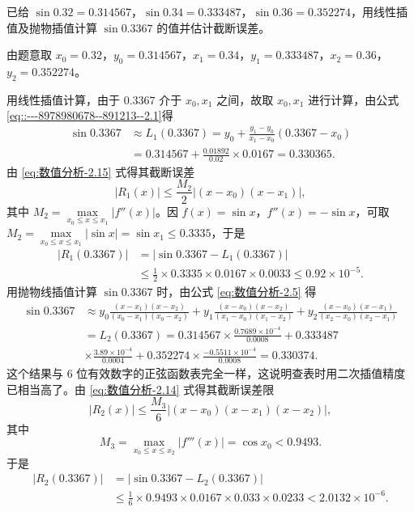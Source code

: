 \documentclass[../../main.tex]{subfiles}
\begin{document}
\begin{example}
已给 $\sin 0.32 = 0.314567$，$\sin 0.34 = 0.333487$，$\sin 0.36 = 0.352274$，用线性插值及抛物插值计算 $\sin 0.3367$ 的值并估计截断误差。
\end{example}
\begin{solution}
由题意取 $x_0 = 0.32$，$y_0 = 0.314567$，$x_1 = 0.34$，$y_1 = 0.333487$，$x_2 = 0.36$，$y_2 = 0.352274$。

用线性插值计算，由于 $0.3367$ 介于 $x_0, x_1$ 之间，故取 $x_0, x_1$ 进行计算，由公式\eqref{eq::---8978980678--891213--2.1}得 
\begin{align*}
\sin 0.3367 &\approx L_1(0.3367) = y_0 + \frac{y_1 - y_0}{x_1 - x_0}(0.3367 - x_0) \\
&= 0.314567 + \frac{0.01892}{0.02} \times 0.0167 = 0.330365.
\end{align*}
由 \eqref{eq:数值分析-2.15} 式得其截断误差 
\[
|R_1(x)| \leqslant \frac{M_2}{2} |(x - x_0)(x - x_1)|,
\]
其中 $M_2 = \max\limits_{x_0 \leqslant x \leqslant x_1} |f''(x)|$。因 $f(x) = \sin x$，$f''(x) = -\sin x$，可取 $M_2 = \max\limits_{x_0 \leqslant x \leqslant x_1} |\sin x| = \sin x_1 \leqslant 0.3335$，于是 
\begin{align*}
|R_1(0.3367)| &= |\sin 0.3367 - L_1(0.3367)| \\
&\leqslant \frac{1}{2} \times 0.3335 \times 0.0167 \times 0.0033 \leqslant 0.92 \times 10^{-5}.
\end{align*}
用抛物线插值计算 $\sin 0.3367$ 时，由公式 \eqref{eq:数值分析-2.5} 得 
\begin{align*}
\sin 0.3367 &\approx y_0 \frac{(x - x_1)(x - x_2)}{(x_0 - x_1)(x_0 - x_2)} + y_1 \frac{(x - x_0)(x - x_2)}{(x_1 - x_0)(x_1 - x_2)} + y_2 \frac{(x - x_0)(x - x_1)}{(x_2 - x_0)(x_2 - x_1)} \\
&= L_2(0.3367) = 0.314567 \times \frac{0.7689 \times 10^{-4}}{0.0008} + 0.333487 \\
&\times \frac{3.89 \times 10^{-4}}{0.0004} + 0.352274 \times \frac{-0.5511 \times 10^{-4}}{0.0008} = 0.330374.
\end{align*}
这个结果与 6 位有效数字的正弦函数表完全一样，这说明查表时用二次插值精度已相当高了。由 \eqref{eq:数值分析-2.14} 式得其截断误差限 
\[
|R_2(x)| \leqslant \frac{M_3}{6} |(x - x_0)(x - x_1)(x - x_2)|,
\]
其中 
\[
M_3 = \max\limits_{x_0 \leqslant x \leqslant x_2} |f'''(x)| = \cos x_0 < 0.9493.
\]
于是 
\begin{align*}
|R_2(0.3367)| &= |\sin 0.3367 - L_2(0.3367)| \\
&\leqslant \frac{1}{6} \times 0.9493 \times 0.0167 \times 0.033 \times 0.0233 < 2.0132 \times 10^{-6}.
\end{align*}

\end{solution}
\end{document}
